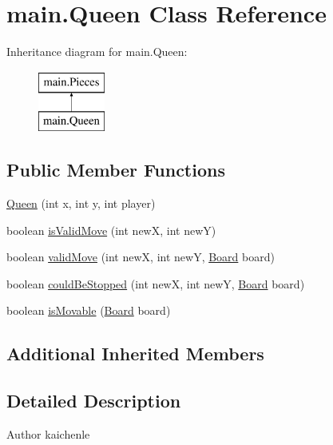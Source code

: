 \hypertarget{classmain_1_1_queen}{}\section{main.\+Queen Class Reference}
\label{classmain_1_1_queen}
Inheritance diagram for main.\+Queen\+:\begin{figure}[H]
\begin{center}
\leavevmode
\includegraphics[height=2.000000cm]{classmain_1_1_queen}
\end{center}
\end{figure}
\subsection*{Public Member Functions}
\begin{DoxyCompactItemize}
\item 
\mbox{\hyperlink{classmain_1_1_queen_ac10f8437486c3ef5ed097034131aba57}{Queen}} (int x, int y, int player)
\item 
boolean \mbox{\hyperlink{classmain_1_1_queen_a0081a5d2f2b4c5e4424dc0db0cff7c4e}{is\+Valid\+Move}} (int newX, int newY)
\item 
boolean \mbox{\hyperlink{classmain_1_1_queen_a47c07514768b4d9cb4b1e60a5bd61fd7}{valid\+Move}} (int newX, int newY, \mbox{\hyperlink{classmain_1_1_board}{Board}} board)
\item 
boolean \mbox{\hyperlink{classmain_1_1_queen_ac4a78f8305a5ce34f14a77691905af79}{could\+Be\+Stopped}} (int newX, int newY, \mbox{\hyperlink{classmain_1_1_board}{Board}} board)
\item 
boolean \mbox{\hyperlink{classmain_1_1_queen_aefc0bc7f1a1603ce266d54cd9cc16676}{is\+Movable}} (\mbox{\hyperlink{classmain_1_1_board}{Board}} board)
\end{DoxyCompactItemize}
\subsection*{Additional Inherited Members}


\subsection{Detailed Description}
\begin{DoxyAuthor}{Author}
kaichenle 
\end{DoxyAuthor}


